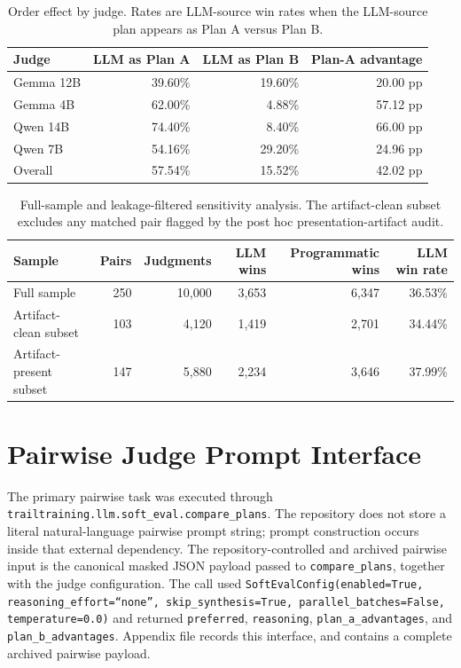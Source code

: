 \documentclass[11pt]{article}
\begin{document}
\begin{table}[H]
\centering
\small
\setlength{\tabcolsep}{4.5pt}
\begin{tabular}{lrrr}
\toprule
Judge & LLM as Plan A & LLM as Plan B & Plan-A advantage \\
\midrule
Gemma 12B & 39.60\% & 19.60\% & 20.00 pp \\
Gemma 4B & 62.00\% & 4.88\% & 57.12 pp \\
Qwen 14B & 74.40\% & 8.40\% & 66.00 pp \\
Qwen 7B & 54.16\% & 29.20\% & 24.96 pp \\
Overall & 57.54\% & 15.52\% & 42.02 pp \\
\bottomrule
\end{tabular}
\caption{Order effect by judge. Rates are LLM-source win rates when the LLM-source plan appears as Plan A versus Plan B.}
\label{tab:order-effect}
\end{table}

\begin{table}[H]
\centering
\small
\setlength{\tabcolsep}{4.5pt}
\begin{tabular}{lrrrrr}
\toprule
Sample & Pairs & Judgments & LLM wins & Programmatic wins & LLM win rate \\
\midrule
Full sample & 250 & 10,000 & 3,653 & 6,347 & 36.53\% \\
Artifact-clean subset & 103 & 4,120 & 1,419 & 2,701 & 34.44\% \\
Artifact-present subset & 147 & 5,880 & 2,234 & 3,646 & 37.99\% \\
\bottomrule
\end{tabular}
\caption{Full-sample and leakage-filtered sensitivity analysis. The artifact-clean subset excludes any matched pair flagged by the post hoc presentation-artifact audit.}
\label{tab:leakage}
\end{table}


\appendix

\section{Pairwise Judge Prompt Interface}
\label{app:pairwise-prompt}
The primary pairwise task was executed through \texttt{trailtraining.llm.soft\_eval.compare\_plans}. The repository does not store a literal natural-language pairwise prompt string; prompt construction occurs inside that external dependency. The repository-controlled and archived pairwise input is the canonical masked JSON payload passed to \texttt{compare\_plans}, together with the judge configuration. The call used \texttt{SoftEvalConfig(enabled=True, reasoning\_effort=``none'', skip\_synthesis=True, parallel\_batches=False, temperature=0.0)} and returned \texttt{preferred}, \texttt{reasoning}, \texttt{plan\_a\_advantages}, and \texttt{plan\_b\_advantages}. Appendix file  records this interface, and  contains a complete archived pairwise payload.
\end{document}
